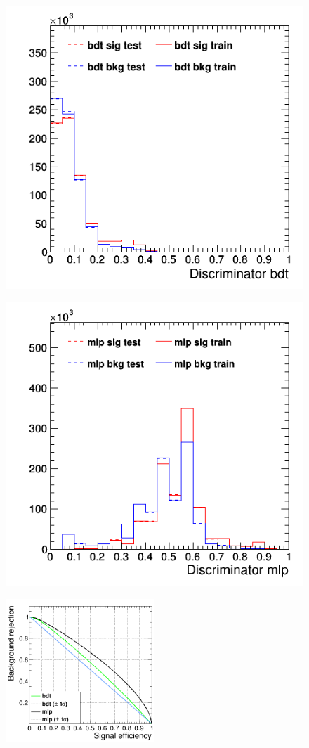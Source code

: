 \documentclass[11pt]{scrartcl}
\begin{document}
	
	\begin{figure}[H]
	\centering
	\begin{minipage}{.5\textwidth}
	  \centering
	  \includegraphics[width=0.75\linewidth]{figures/MVA/select3/config1/discriminator_bdt.png}
	  \label{fig:distr_s3_config1_bdt}
	\end{minipage}%
	\begin{minipage}{.5\textwidth}
	  \centering
	  \includegraphics[width=0.75\linewidth]{figures/MVA/select3/config1/discriminator_mlp.png}
	  \label{fig:distr_s3_config1_mlp}
	\end{minipage}
	\centering
	\includegraphics[width=0.5\textwidth]{figures/MVA/select3/config1/FOM_selection3_nL5_nT400_mD1_nC10.png}

\end{figure}
\end{document}
